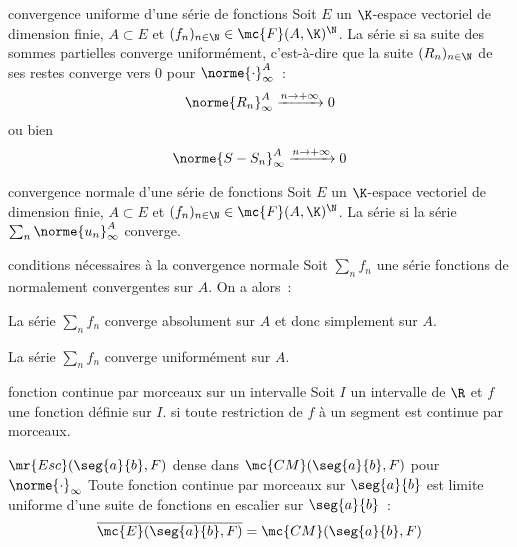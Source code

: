 \begin{adjustwidth}{-3cm}{-3cm}
\begin{definition}{9.19}{convergence uniforme d'une série de fonctions}
    Soit $E$ un $\K$-espace vectoriel de dimension finie, $A \subset E$ et $(f_n)_{n \in \N} \in \mc{F}(A,\K)^\N$. La série  si sa suite des sommes partielles converge uniformément, c’est-à-dire que la suite $(R_n)_{n \in \N}$ de ses restes converge vers $0$ pour $\norme{\cdot}_\infty^A$~:
    $$\norme{R_n}_\infty^A \xrightarrow{n \to + \infty} 0$$
    ou bien
    $$\norme{S - S_n}_\infty^A \xrightarrow{n \to + \infty} 0$$
\end{definition}

\begin{definition}{9.20}{convergence normale d'une série de fonctions}
    Soit $E$ un $\K$-espace vectoriel de dimension finie, $A \subset E$ et $(f_n)_{n \in \N} \in \mc{F}(A,\K)^\N$. La série  si la série $\sum_n \norme{u_n}_\infty^A$ converge.
\end{definition}

\begin{proposition}{9.25}{conditions nécessaires à la convergence normale}
    Soit $\sum_n f_n$ une série fonctions de normalement convergentes sur $A$. On a alors~:
    \begin{enumeratebf}
        \item La série $\sum_n f_n$ converge absolument sur $A$ et donc simplement sur $A$.
        \item La série $\sum_n f_n$ converge uniformément sur $A$.
    \end{enumeratebf}
\end{proposition}

\begin{definition}{9.40}{fonction continue par morceaux sur un intervalle}
    Soit $I$ un intervalle de $\R$ et $f$ une fonction définie sur $I$.  si toute restriction de $f$ à un segment est continue par morceaux.
\end{definition}

\begin{theoreme}{9.43}{$\mr{Esc}(\seg{a}{b},F)$ dense dans $\mc{CM}(\seg{a}{b},F)$ pour $\norme{\cdot}_\infty$}
    Toute fonction continue par morceaux sur $\seg{a}{b}$ est limite uniforme d'une suite de fonctions en escalier sur $\seg{a}{b}$~:
    $$\overline{\mc{E}(\seg{a}{b},F)} = \mc{CM}(\seg{a}{b},F)$$
\end{theoreme}


\end{adjustwidth}
